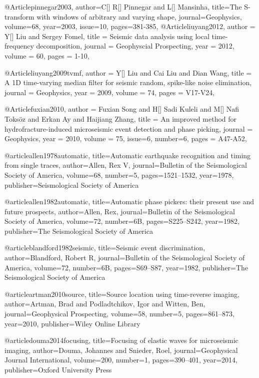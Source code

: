 @Article{pinnegar2003,
author={C[] R[] Pinnegar and L[] Mansinha},
title={The S-transform with windows of arbitrary and varying shape},
journal={Geophysics},
volume=68,
year=2003,
issue=10,
pages={381-385},
}
@Article{liuyang2012,
  author = 	 {Y[] Liu and Sergey Fomel},
  title = 	 {Seismic data analysis using local time-frequency decomposition},
  journal = 	 {Geophyscial Prospecting},
  year = 	 2012,
  volume =	 60,
  pages =	 {1-10},
}

@Article{liuyang2009tvmf,
  author = 	 {Y[] Liu and Cai Liu and Dian Wang},
  title = 	 {A 1D time-varying median filter for seismic random, spike-like noise elimination},
  journal = 	 {Geophysics},
  year = 	 2009,
  volume =	 74,
  pages =	 {V17-V24},
}

@Article{fuxian2010,
  author = 	 {Fuxian Song and H[] Sadi Kuleli and M[] Nafi Toks\"{o}z and Erkan Ay and Haijiang Zhang},
  title = 	 {An improved method for hydrofracture-induced microseismic event detection and phase picking},
  journal = 	 {Geophysics},
  year = 	 2010,
  volume =	 75,
  issue=6,
  number=6,
  pages =	 {A47-A52},
}

@article{allen1978automatic,
  title={Automatic earthquake recognition and timing from single traces},
  author={Allen, Rex V},
  journal={Bulletin of the Seismological Society of America},
  volume={68},
  number={5},
  pages={1521--1532},
  year={1978},
  publisher={Seismological Society of America}
}

@article{allen1982automatic,
  title={Automatic phase pickers: their present use and future prospects},
  author={Allen, Rex},
  journal={Bulletin of the Seismological Society of America},
  volume={72},
  number={6B},
  pages={S225--S242},
  year={1982},
  publisher={The Seismological Society of America}
}

@article{blandford1982seismic,
  title={Seismic event discrimination},
  author={Blandford, Robert R},
  journal={Bulletin of the Seismological Society of America},
  volume={72},
  number={6B},
  pages={S69--S87},
  year={1982},
  publisher={The Seismological Society of America}
}

@article{artman2010source,
  title={Source location using time-reverse imaging},
  author={Artman, Brad and Podladtchikov, Igor and Witten, Ben},
  journal={Geophysical Prospecting},
  volume={58},
  number={5},
  pages={861--873},
  year={2010},
  publisher={Wiley Online Library}
}

@article{douma2014focusing,
  title={Focusing of elastic waves for microseismic imaging},
  author={Douma, Johannes and Snieder, Roel},
  journal={Geophysical Journal International},
  volume={200},
  number={1},
  pages={390--401},
  year={2014},
  publisher={Oxford University Press}
}

